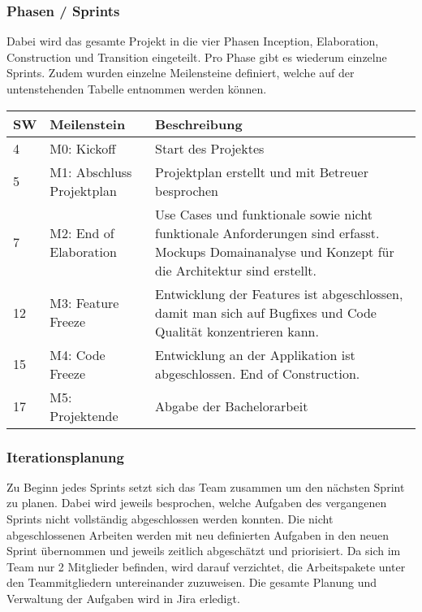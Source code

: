 \subsubsection{Phasen / Sprints}
Dabei wird das gesamte Projekt in die vier Phasen Inception, Elaboration, Construction und Transition eingeteilt. Pro Phase gibt es wiederum einzelne Sprints. Zudem wurden einzelne Meilensteine definiert, welche auf der untenstehenden Tabelle entnommen werden können.
\begin{center}
	\begin{tabularx}{\textwidth}{p{} p{} p{}}
	\toprule
	SW & Meilenstein & Beschreibung \\ \midrule
	4 & M0: Kickoff & Start des Projektes \\ 
	5 & M1: Abschluss Projektplan & Projektplan erstellt und mit Betreuer \newline besprochen \\
	7 & M2: End of Elaboration & Use Cases und funktionale sowie nicht \newline funktionale Anforderungen sind erfasst. \newline Mockups Domainanalyse und Konzept für \newline die Architektur sind erstellt. \\
	12 & M3: Feature Freeze & Entwicklung der Features ist \newline abgeschlossen, damit man sich auf Bugfixes \newline und Code Qualität konzentrieren kann.\\
	15 & M4: Code Freeze & Entwicklung an der Applikation ist \newline abgeschlossen. End of Construction.\\
	17 & M5: Projektende & Abgabe der Bachelorarbeit \\ \bottomrule
	\end{tabularx}
\end{center}

\subsubsection{Iterationsplanung}
Zu Beginn jedes Sprints setzt sich das Team zusammen um den nächsten Sprint zu planen. Dabei wird jeweils besprochen, welche Aufgaben des vergangenen Sprints nicht vollständig abgeschlossen werden konnten. Die nicht abgeschlossenen Arbeiten werden mit neu definierten Aufgaben in den neuen Sprint übernommen und jeweils zeitlich abgeschätzt und priorisiert. Da sich im Team nur 2 Mitglieder befinden, wird darauf verzichtet, die Arbeitspakete unter den Teammitgliedern untereinander zuzuweisen. Die gesamte Planung und Verwaltung der Aufgaben wird in Jira erledigt.

